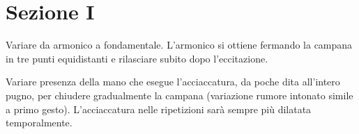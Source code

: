\documentclass{book}
\begin{document}




\section*{\centering Sezione I}

\begin{minipage}{0.2\textwidth}
\end{minipage}%
\begin{minipage}{0.6\textwidth}
\justify Variare da armonico a fondamentale. L'armonico si ottiene fermando la campana in tre punti equidistanti e rilasciare subito dopo l'eccitazione. 
\end{minipage}




\begin{minipage}{0.2\textwidth}
\end{minipage}%
\begin{minipage}{0.6\textwidth}
\justify Variare presenza della mano che esegue l'acciaccatura, da poche dita all'intero pugno, per chiudere gradualmente la campana (variazione rumore intonato simile a primo gesto). L'acciaccatura nelle ripetizioni sarà sempre più dilatata temporalmente.
\end{minipage}
\end{document}
